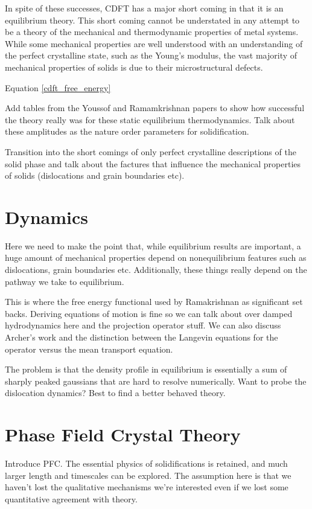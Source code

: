 In spite of these successes, CDFT has a major short coming in that it is an
equilibrium theory. This short coming cannot be understated in any attempt to
be a theory of the mechanical and thermodynamic properties of metal systems.
While some mechanical properties are well understood with an understanding of
the perfect crystalline state, such as the Young's modulus, the vast majority
of mechanical properties of solids is due to their microstructural defects.


Equation \ref{cdft_free_energy} {\color{ForestGreen} { \bfseries
    
    Add tables from the Youssof and Ramamkrishnan papers to show how successful
    the theory really was for these static equilibrium thermodynamics. Talk
    about these amplitudes as the nature order parameters for solidification.
    
    Transition into the short comings of only perfect crystalline
    descriptions of the solid phase and talk about the factures that
    influence the mechanical properties of solids (dislocations and grain
    boundaries etc).} }

\section{Dynamics} %

{\color{ForestGreen} { \bfseries
    
    
    Here we need to make the point that, while equilibrium results are
    important, a huge amount of mechanical properties depend on
    nonequilibrium features such as dislocations, grain boundaries etc.
    Additionally, these things really depend on the pathway we take to
    equilibrium. 

    This is where the free energy functional used by Ramakrishnan as
    significant set backs. Deriving equations of motion is fine so we can
    talk about over damped hydrodynamics here and the projection operator
    stuff. We can also discuss Archer's work and the distinction between
    the Langevin equations for the operator versus the mean transport
    equation.

    The problem is that the density profile in equilibrium is essentially
    a sum of sharply peaked gaussians that are hard to resolve
    numerically. Want to probe the dislocation dynamics? Best to find a
    better behaved theory.} }

\section{Phase Field Crystal Theory} %

{\color{ForestGreen} {\bfseries


    Introduce PFC. The essential physics of solidifications is retained,
    and much larger length and timescales can be explored. The assumption
    here is that we haven't lost the qualitative mechanisms we're
    interested even if we lost some quantitative agreement with theory.} }
